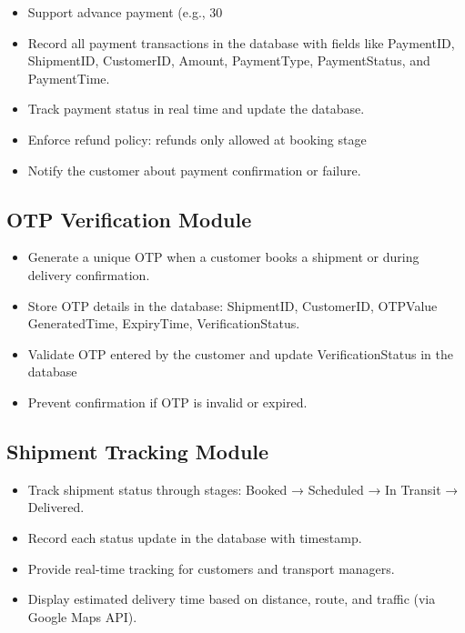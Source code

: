 \documentclass[12pt,a4paper]{article}
\begin{document}
\begin{itemize}

\item Support advance payment (e.g., 30%
\item Record all payment transactions in the database with fields like PaymentID, ShipmentID, CustomerID, Amount, PaymentType, PaymentStatus, and PaymentTime.
\item Track payment status in real time and update the database.
\item Enforce refund policy: refunds only allowed at booking stage
\item Notify the customer about payment confirmation or failure.

\end{itemize}

\subsection{OTP Verification Module}

\begin{itemize}

\item Generate a unique OTP when a customer books a shipment or during delivery confirmation.
\item Store OTP details in the database: ShipmentID, CustomerID, OTPValue GeneratedTime, ExpiryTime, VerificationStatus.
\item Validate OTP entered by the customer and update VerificationStatus in the database
\item Prevent confirmation if OTP is invalid or expired.

\end{itemize}

\subsection{Shipment Tracking Module}

\begin{itemize}

\item Track shipment status through stages: Booked → Scheduled → In Transit → Delivered.
\item Record each status update in the database with timestamp.
 \item Provide real-time tracking for customers and transport managers.
\item Display estimated delivery time based on distance, route, and traffic (via Google Maps API).



\end{itemize}
\end{document}
